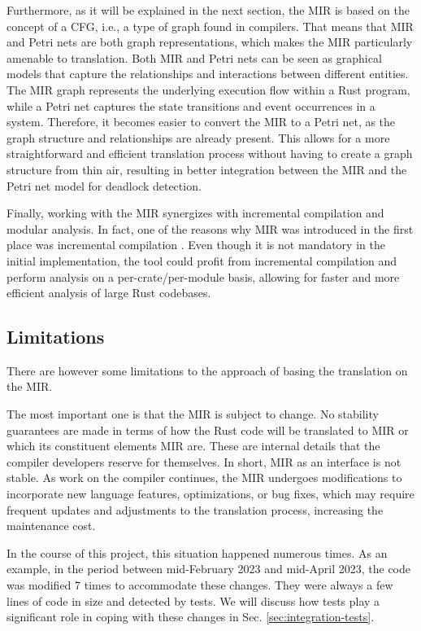 Furthermore, as it will be explained in the next section, the \acrshort{MIR}
is based on the concept of a \acrfull{CFG}, i.e., a type of graph found in compilers.
That means that \acrshort{MIR} and Petri nets are both graph representations,
which makes the \acrshort{MIR} particularly amenable to translation.
Both \acrshort{MIR} and Petri nets can be seen as graphical models
that capture the relationships and interactions between different entities.
The \acrshort{MIR} graph represents the underlying execution flow within a Rust program,
while a Petri net captures the state transitions and event occurrences in a system.
Therefore, it becomes easier to convert the \acrshort{MIR} to a Petri net,
as the graph structure and relationships are already present.
This allows for a more straightforward and efficient translation process
without having to create a graph structure from thin air,
resulting in better integration between the \acrshort{MIR}
and the Petri net model for deadlock detection.

Finally, working with the \acrshort{MIR} synergizes
with incremental compilation and modular analysis.
In fact, one of the reasons why \acrshort{MIR} was introduced
in the first place was incremental compilation \cite{matsakis2016mir}.
Even though it is not mandatory in the initial implementation,
the tool could profit from incremental compilation
and perform analysis on a per-crate/per-module basis,
allowing for faster and more efficient analysis of large Rust codebases.

\subsection{Limitations}

There are however some limitations to the approach of basing the translation
on the \acrfull{MIR}.

The most important one is that the \acrshort{MIR} is subject to change.
No stability guarantees are made in terms of
how the Rust code will be translated to \acrshort{MIR}
or which its constituent elements \acrshort{MIR} are.
These are internal details that the compiler developers reserve for themselves.
In short, \acrshort{MIR} as an interface is not stable.
As work on the compiler continues,
the \acrshort{MIR} undergoes modifications
to incorporate new language features, optimizations, or bug fixes,
which may require frequent updates and adjustments to the translation process,
increasing the maintenance cost.

In the course of this project, this situation happened numerous times.
As an example, in the period between mid-February 2023 and mid-April 2023,
the code was modified 7 times to accommodate these changes.
They were always a few lines of code in size and detected by tests.
We will discuss how tests play a significant role
in coping with these changes in Sec. \ref{sec:integration-tests}.

